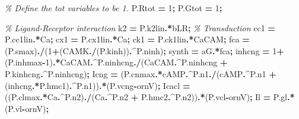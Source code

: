\documentclass[
]{article}
\newenvironment{Shaded}{\begin{snugshade}}{\end{snugshade}}
\newcommand{\CommentTok}[1]{\textcolor[rgb]{0.56,0.35,0.01}{\textit{#1}}}
\newcommand{\FloatTok}[1]{\textcolor[rgb]{0.00,0.00,0.81}{#1}}
\newcommand{\NormalTok}[1]{#1}
\newcommand{\OperatorTok}[1]{\textcolor[rgb]{0.81,0.36,0.00}{\textbf{#1}}}
\begin{document}
\begin{Shaded}
\begin{Highlighting}[]
        \CommentTok{\% Define the tot variables to be 1.}
\NormalTok{        P.Rtot }\OperatorTok{=} \FloatTok{1}\OperatorTok{;}
\NormalTok{        P.Gtot }\OperatorTok{=} \FloatTok{1}\OperatorTok{;}

        \CommentTok{\% Ligand{-}Receptor interaction}
\NormalTok{        k2 }\OperatorTok{=}\NormalTok{ P.k2lin}\OperatorTok{.*}\NormalTok{bLR}\OperatorTok{;}
        \CommentTok{\% Transduction}
\NormalTok{        cc1 }\OperatorTok{=}\NormalTok{ P.cc1lin}\OperatorTok{.*}\NormalTok{Ca}\OperatorTok{;}
\NormalTok{        cx1 }\OperatorTok{=}\NormalTok{ P.cx1lin}\OperatorTok{.*}\NormalTok{Ca}\OperatorTok{;}
\NormalTok{        ck1 }\OperatorTok{=}\NormalTok{ P.ck1lin}\OperatorTok{.*}\NormalTok{CaCAM}\OperatorTok{;}
\NormalTok{        fca }\OperatorTok{=}\NormalTok{ (P.smax)}\OperatorTok{./}\NormalTok{(}\FloatTok{1}\OperatorTok{+}\NormalTok{(CAMK}\OperatorTok{./}\NormalTok{(P.kinh))}\OperatorTok{.\^{}}\NormalTok{P.ninh)}\OperatorTok{;}
\NormalTok{        synth }\OperatorTok{=}\NormalTok{ aG}\OperatorTok{.*}\NormalTok{fca}\OperatorTok{;}
\NormalTok{        inhcng }\OperatorTok{=} \FloatTok{1}\OperatorTok{+}\NormalTok{(P.inhmax}\OperatorTok{{-}}\FloatTok{1}\NormalTok{)}\OperatorTok{.*}\NormalTok{CaCAM}\OperatorTok{.\^{}}\NormalTok{P.ninhcng}\OperatorTok{./}\NormalTok{(CaCAM}\OperatorTok{.\^{}}\NormalTok{P.ninhcng }\OperatorTok{+}\NormalTok{ P.kinhcng}\OperatorTok{.\^{}}\NormalTok{P.ninhcng)}\OperatorTok{;}   
\NormalTok{        Icng }\OperatorTok{=}\NormalTok{ (P.cnmax}\OperatorTok{.*}\NormalTok{cAMP}\OperatorTok{.\^{}}\NormalTok{P.n1}\OperatorTok{./}\NormalTok{(cAMP}\OperatorTok{.\^{}}\NormalTok{P.n1 }\OperatorTok{+}\NormalTok{ (inhcng}\OperatorTok{.*}\NormalTok{P.hmc1)}\OperatorTok{.\^{}}\NormalTok{P.n1))}\OperatorTok{.*}\NormalTok{(P.vcng}\OperatorTok{{-}}\NormalTok{ornV)}\OperatorTok{;}     
\NormalTok{        Icacl }\OperatorTok{=}\NormalTok{ ((P.clmax}\OperatorTok{.*}\NormalTok{Ca}\OperatorTok{.\^{}}\NormalTok{P.n2)}\OperatorTok{./}\NormalTok{(Ca}\OperatorTok{.\^{}}\NormalTok{P.n2 }\OperatorTok{+}\NormalTok{ P.hmc2}\OperatorTok{.\^{}}\NormalTok{P.n2))}\OperatorTok{.*}\NormalTok{(P.vcl}\OperatorTok{{-}}\NormalTok{ornV)}\OperatorTok{;}
\NormalTok{        Il }\OperatorTok{=}\NormalTok{ P.gl}\OperatorTok{.*}\NormalTok{(P.vl}\OperatorTok{{-}}\NormalTok{ornV)}\OperatorTok{;}


\end{Highlighting}
\end{Shaded}
\end{document}
